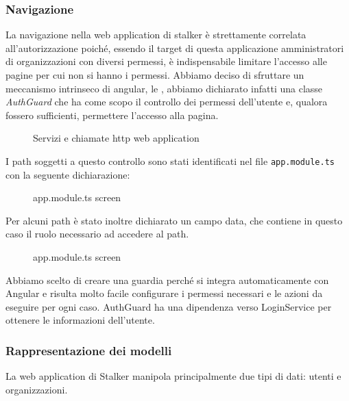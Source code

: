 \documentclass[../../manuale-manutentore.tex]{subfiles}
\begin{document}
\subsubsection{Navigazione}%
\label{subs:navigazione}

La navigazione nella web application di stalker è strettamente correlata all'autorizzazione poiché, essendo il target di questa applicazione amministratori di organizzazioni con diversi permessi, è indispensabile limitare l'accesso alle pagine per cui non si hanno i permessi.
Abbiamo deciso di sfruttare un meccanismo intrinseco di angular, le , abbiamo dichiarato infatti una classe \textit{AuthGuard} che ha come scopo il controllo dei permessi dell'utente e, qualora fossero sufficienti, permettere l'accesso alla pagina.
\begin{figure}[H]
  \centering
  \caption{Servizi e chiamate http web application}%
  \label{fig:web-app-authguard}
\end{figure}
I path soggetti a questo controllo sono stati identificati nel file \texttt{app.module.ts} con la seguente dichiarazione:
\begin{figure}[H]
  \centering
  \caption{app.module.ts screen}%
  \label{fig:web-app-appmodule-screen-1}
\end{figure}

Per alcuni path è stato inoltre dichiarato un campo data, che contiene in questo caso il ruolo necessario ad accedere al path.
\begin{figure}[H]
  \centering
  \caption{app.module.ts screen}%
  \label{fig:web-app-appmodule-screen-2}
\end{figure}
Abbiamo scelto di creare una guardia perché si integra automaticamente con Angular e risulta molto facile configurare i permessi necessari e le azioni da eseguire per ogni caso.
AuthGuard ha una dipendenza verso LoginService per ottenere le informazioni dell'utente.


\subsubsection{Rappresentazione dei modelli}%
\label{subs:modelli}

La web application di Stalker manipola principalmente due tipi di dati: utenti e organizzazioni.
\end{document}

